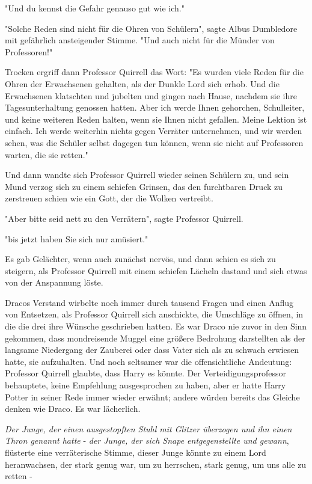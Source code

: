{"Und du kennst die Gefahr genauso gut wie ich."

"Solche Reden sind nicht für die Ohren von Schülern", sagte Albus Dumbledore mit gefährlich ansteigender Stimme. "Und auch nicht für die Münder von Professoren!"

Trocken ergriff dann Professor Quirrell das Wort: "Es wurden viele Reden für die Ohren der Erwachsenen gehalten, als der Dunkle Lord sich erhob. Und die Erwachsenen klatschten und jubelten und gingen nach Hause, nachdem sie ihre Tagesunterhaltung genossen hatten. Aber ich werde Ihnen gehorchen, Schulleiter, und keine weiteren Reden halten, wenn sie Ihnen nicht gefallen. Meine Lektion ist einfach. Ich werde weiterhin nichts gegen Verräter unternehmen, und wir werden sehen, was die Schüler selbst dagegen tun können, wenn sie nicht auf Professoren warten, die sie retten."

Und dann wandte sich Professor Quirrell wieder seinen Schülern zu, und sein Mund verzog sich zu einem schiefen Grinsen, das den furchtbaren Druck zu zerstreuen schien wie ein Gott, der die Wolken vertreibt.

"Aber bitte seid nett zu den Verrätern", sagte Professor Quirrell.

"bis jetzt haben Sie sich nur amüsiert."

Es gab Gelächter, wenn auch zunächst nervös, und dann schien es sich zu steigern, als Professor Quirrell mit einem schiefen Lächeln dastand und sich etwas von der Anspannung löste.

Dracos Verstand wirbelte noch immer durch tausend Fragen und einen Anflug von Entsetzen, als Professor Quirrell sich anschickte, die Umschläge zu öffnen, in die die drei ihre Wünsche geschrieben hatten. Es war Draco nie zuvor in den Sinn gekommen, dass mondreisende Muggel eine größere Bedrohung darstellten als der langsame Niedergang der Zauberei oder dass Vater sich als zu schwach erwiesen hatte, sie aufzuhalten. Und noch seltsamer war die offensichtliche Andeutung: Professor Quirrell glaubte, dass Harry es könnte. Der Verteidigungsprofessor behauptete, keine Empfehlung ausgesprochen zu haben, aber er hatte Harry Potter in seiner Rede immer wieder erwähnt; andere würden bereits das Gleiche denken wie Draco. Es war lächerlich.

\emph{Der Junge, der einen ausgestopften Stuhl mit Glitzer überzogen und ihn einen Thron genannt hatte} - \emph{der Junge, der sich Snape entgegenstellte und gewann}, flüsterte eine verräterische Stimme, dieser Junge könnte zu einem Lord heranwachsen, der stark genug war, um zu herrschen, stark genug, um uns alle zu retten -

}
